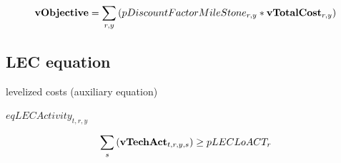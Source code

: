 \documentclass{article}
\begin{document}
\begin{dmath} 
{\bf vObjective}  =  \sum_{r,y}{\left(pDiscountFactorMileStone_{r,y}*{\bf vTotalCost}_{r,y}\right)}
\end{dmath} 
\subsection*{LEC equation}
levelized costs (auxiliary equation)







$eqLECActivity_{t,r,y}$





\begin{dmath} 
\sum_{s}{\left({\bf vTechAct}_{t,r,y,s}\right)}  \ge  pLECLoACT_{r}
\end{dmath} 
\end{document}
